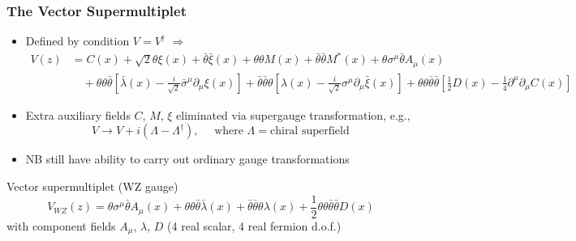 \documentclass[10pt,aspectratio=169]{beamer}
\begin{document}
\begin{frame}
  \frametitle{The Vector Supermultiplet}
  \begin{itemize}
  \item Defined by condition $V = V^\dagger$ $\Rightarrow$
    \begin{align*}
      V(z) &= C(x) + \sqrt{2} \theta \xi(x) + \bar{\theta} \bar{\xi}(x)
      + \theta \theta M(x) + \bar{\theta} \bar{\theta} M^*(x) +
      \theta \sigma^\mu\bar{\theta}A_\mu(x) \\
      & \quad {} + \theta\theta \bar{\theta}
      \left [ \bar{\lambda}(x) - \frac{i}{\sqrt{2}} \bar{\sigma}^\mu\partial_\mu
        \xi(x) \right ]
        + \bar{\theta} \bar{\theta} \theta \left [ \lambda(x)
        - \frac{i}{\sqrt{2}} \sigma^\mu \partial_\mu \bar{\xi}(x) \right ]
      + \theta\theta \bar{\theta}\bar{\theta} \left [ \frac{1}{2} D(x) -
        \frac{1}{4} \partial^\mu\partial_\mu C(x) \right ]
    \end{align*}
  \item Extra auxiliary fields $C$, $M$, $\xi$ eliminated via supergauge
    transformation, e.g.,
    \begin{equation*}
      V \to V + i ( \Lambda - \Lambda^\dagger ) , \quad \text{ where } \Lambda
      = \text{chiral superfield}
    \end{equation*}
  \item NB still have ability to carry out ordinary gauge transformations
  \end{itemize}
  \begin{block}{Vector supermultiplet (WZ gauge)}
    \begin{equation*}
      V_{WZ}(z) = \theta \sigma^\mu \bar{\theta} A_\mu(x) + \theta \theta
      \bar{\theta} \bar{\lambda}(x) + \bar{\theta} \bar{\theta} \theta
      \lambda(x) + \frac{1}{2} \theta\theta\bar{\theta}\bar{\theta} D(x)
    \end{equation*}
    with component fields $A_\mu$, $\lambda$, $D$ (4 real scalar, 4 real
    fermion d.o.f.)
  \end{block}
\end{frame}
\end{document}
